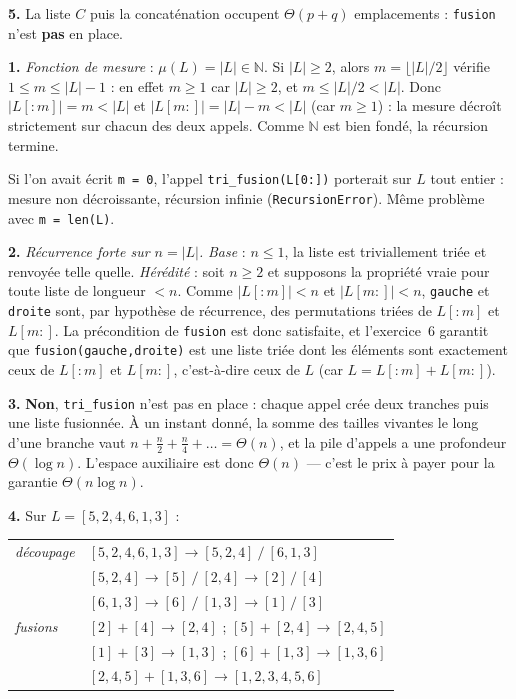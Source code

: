 \documentclass[11pt,a4paper]{article}
\begin{document}
\textbf{5.} La liste $C$ puis la concaténation occupent $\Theta(p+q)$ emplacements :
\texttt{fusion} n'est \textbf{pas} en place.

\reponse
\textbf{1.} \emph{Fonction de mesure} : $\mu(L)=|L|\in\mathbb N$.
Si $|L|\ge2$, alors $m=\lfloor |L|/2\rfloor$ vérifie $1\le m\le |L|-1$ :
en effet $m\ge1$ car $|L|\ge2$, et $m\le |L|/2<|L|$. Donc
$|L[:m]|=m<|L|$ et $|L[m:]|=|L|-m<|L|$ (car $m\ge1$) : la mesure décroît strictement
sur chacun des deux appels. Comme $\mathbb N$ est bien fondé, la récursion termine.

Si l'on avait écrit \texttt{m = 0}, l'appel \texttt{tri\_fusion(L[0:])} porterait sur
$L$ tout entier : mesure non décroissante, récursion infinie
(\texttt{RecursionError}). Même problème avec \texttt{m = len(L)}.

\textbf{2.} \emph{Récurrence forte sur $n=|L|$.}
\emph{Base} : $n\le1$, la liste est triviallement triée et renvoyée telle quelle.
\emph{Hérédité} : soit $n\ge2$ et supposons la propriété vraie pour toute liste de
longueur $<n$. Comme $|L[:m]|<n$ et $|L[m:]|<n$, \texttt{gauche} et \texttt{droite} sont,
par hypothèse de récurrence, des permutations triées de $L[:m]$ et $L[m:]$.
La précondition de \texttt{fusion} est donc satisfaite, et l'exercice~6 garantit que
\texttt{fusion(gauche,droite)} est une liste triée dont les éléments sont exactement ceux
de $L[:m]$ et $L[m:]$, c'est-à-dire ceux de $L$ (car $L=L[:m]+L[m:]$). \checkmark

\textbf{3.} \textbf{Non}, \texttt{tri\_fusion} n'est pas en place : chaque appel crée
deux tranches puis une liste fusionnée.
À un instant donné, la somme des tailles vivantes le long d'une branche vaut
$n+\frac n2+\frac n4+\dots = \Theta(n)$, et la pile d'appels a une profondeur
$\Theta(\log n)$. L'espace auxiliaire est donc $\Theta(n)$ --- c'est le prix à payer pour
la garantie $\Theta(n\log n)$.

\textbf{4.} Sur $L=[5,2,4,6,1,3]$ :
\begin{center}\small
\begin{tabular}{ll}
\emph{découpage} & $[5,2,4,6,1,3] \to [5,2,4]\ /\ [6,1,3]$\\
                 & $[5,2,4]\to[5]\ /\ [2,4]\to[2]\,/\,[4]$ \\
                 & $[6,1,3]\to[6]\ /\ [1,3]\to[1]\,/\,[3]$ \\[4pt]
\emph{fusions}   & $[2]+[4]\to[2,4]$ ; $[5]+[2,4]\to[2,4,5]$\\
                 & $[1]+[3]\to[1,3]$ ; $[6]+[1,3]\to[1,3,6]$\\
                 & $[2,4,5]+[1,3,6]\to[1,2,3,4,5,6]$\\
\end{tabular}
\end{center}
\end{document}
